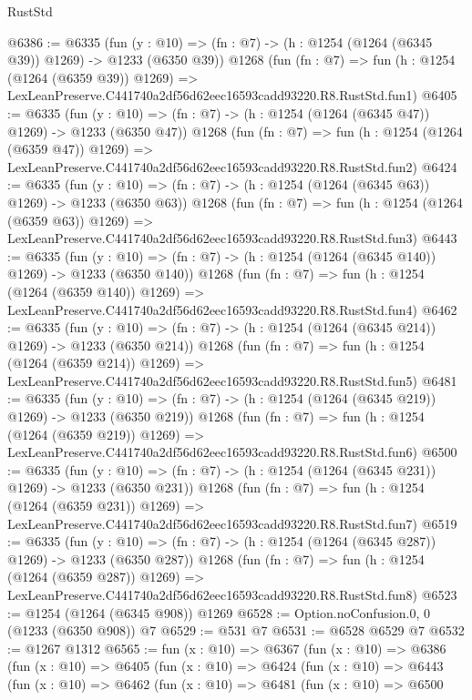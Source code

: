\begin{lexlean}{RustStd}
\begin{coremodule}
@6386 := @6335
    (fun (y : @10) => (fn : @7) -> (h : @1254 (@1264 (@6345 @39)) @1269) -> @1233 (@6350 @39))
    @1268
    (fun (fn : @7) =>
    fun (h : @1254 (@1264 (@6359 @39)) @1269) =>
    LexLeanPreserve.C441740a2df56d62eec16593cadd93220.R8.RustStd.fun1)
@6405 := @6335
    (fun (y : @10) => (fn : @7) -> (h : @1254 (@1264 (@6345 @47)) @1269) -> @1233 (@6350 @47))
    @1268
    (fun (fn : @7) =>
    fun (h : @1254 (@1264 (@6359 @47)) @1269) =>
    LexLeanPreserve.C441740a2df56d62eec16593cadd93220.R8.RustStd.fun2)
@6424 := @6335
    (fun (y : @10) => (fn : @7) -> (h : @1254 (@1264 (@6345 @63)) @1269) -> @1233 (@6350 @63))
    @1268
    (fun (fn : @7) =>
    fun (h : @1254 (@1264 (@6359 @63)) @1269) =>
    LexLeanPreserve.C441740a2df56d62eec16593cadd93220.R8.RustStd.fun3)
@6443 := @6335
    (fun (y : @10) => (fn : @7) -> (h : @1254 (@1264 (@6345 @140)) @1269) -> @1233 (@6350 @140))
    @1268
    (fun (fn : @7) =>
    fun (h : @1254 (@1264 (@6359 @140)) @1269) =>
    LexLeanPreserve.C441740a2df56d62eec16593cadd93220.R8.RustStd.fun4)
@6462 := @6335
    (fun (y : @10) => (fn : @7) -> (h : @1254 (@1264 (@6345 @214)) @1269) -> @1233 (@6350 @214))
    @1268
    (fun (fn : @7) =>
    fun (h : @1254 (@1264 (@6359 @214)) @1269) =>
    LexLeanPreserve.C441740a2df56d62eec16593cadd93220.R8.RustStd.fun5)
@6481 := @6335
    (fun (y : @10) => (fn : @7) -> (h : @1254 (@1264 (@6345 @219)) @1269) -> @1233 (@6350 @219))
    @1268
    (fun (fn : @7) =>
    fun (h : @1254 (@1264 (@6359 @219)) @1269) =>
    LexLeanPreserve.C441740a2df56d62eec16593cadd93220.R8.RustStd.fun6)
@6500 := @6335
    (fun (y : @10) => (fn : @7) -> (h : @1254 (@1264 (@6345 @231)) @1269) -> @1233 (@6350 @231))
    @1268
    (fun (fn : @7) =>
    fun (h : @1254 (@1264 (@6359 @231)) @1269) =>
    LexLeanPreserve.C441740a2df56d62eec16593cadd93220.R8.RustStd.fun7)
@6519 := @6335
    (fun (y : @10) => (fn : @7) -> (h : @1254 (@1264 (@6345 @287)) @1269) -> @1233 (@6350 @287))
    @1268
    (fun (fn : @7) =>
    fun (h : @1254 (@1264 (@6359 @287)) @1269) =>
    LexLeanPreserve.C441740a2df56d62eec16593cadd93220.R8.RustStd.fun8)
@6523 := @1254 (@1264 (@6345 @908)) @1269
@6528 := Option.noConfusion.{0, 0} (@1233 (@6350 @908)) @7
@6529 := @531 @7
@6531 := @6528 @6529 @7
@6532 := @1267 @1312
@6565 := fun (x : @10) =>
  @6367
    (fun (x : @10) =>
    @6386
      (fun (x : @10) =>
      @6405
        (fun (x : @10) =>
        @6424
          (fun (x : @10) =>
          @6443
            (fun (x : @10) =>
            @6462
              (fun (x : @10) =>
              @6481
                (fun (x : @10) =>
                @6500

\end{coremodule}
\end{lexlean}
